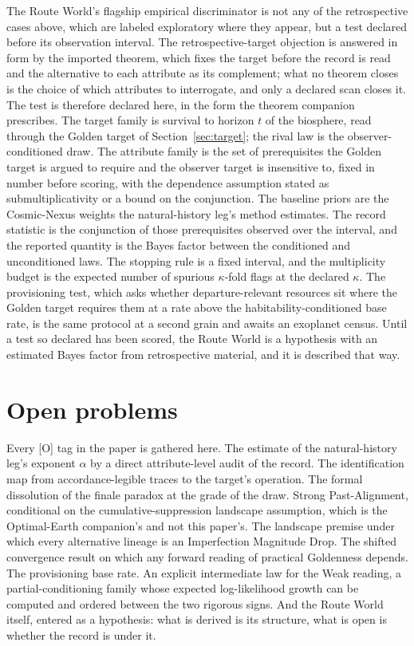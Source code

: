 The Route World's flagship empirical discriminator is not any of the
retrospective cases above, which are labeled exploratory where they
appear, but a test declared before its observation interval. The
retrospective-target objection is answered in form by the imported
theorem, which fixes the target before the record is read and the
alternative to each attribute as its complement; what no theorem closes
is the choice of which attributes to interrogate, and only a declared
scan closes it. The test is therefore declared here, in the form the
theorem companion prescribes. The target family is survival to horizon
$t$ of the biosphere, read through the Golden target of
Section~\ref{sec:target}; the rival law is the observer-conditioned
draw. The attribute family is the set of prerequisites the Golden target
is argued to require and the observer target is insensitive to, fixed in
number before scoring, with the dependence assumption stated as
submultiplicativity or a bound on the conjunction. The baseline priors are
the Cosmic-Nexus weights the natural-history leg's method estimates. The
record statistic is the conjunction of those prerequisites observed over
the interval, and the reported quantity is the Bayes factor between the
conditioned and unconditioned laws. The stopping rule is a fixed
interval, and the multiplicity budget is the expected number of spurious
$\kappa$-fold flags at the declared $\kappa$. The provisioning test, which
asks whether departure-relevant resources sit where the Golden target
requires them at a rate above the habitability-conditioned base rate,
is the same protocol at a second grain and awaits an exoplanet census.
Until a test so declared has been scored, the Route World is a hypothesis
with an estimated Bayes factor from retrospective material, and it is
described that way.

\section{Open problems}\label{sec:open}

Every [O] tag in the paper is gathered here. The estimate of the
natural-history leg's exponent $\alpha$ by a direct attribute-level audit
of the record. The identification map from accordance-legible traces to
the target's operation. The formal dissolution of the finale paradox at
the grade of the draw. Strong Past-Alignment, conditional on the
cumulative-suppression landscape assumption, which is the Optimal-Earth
companion's and not this paper's. The landscape premise under which every
alternative lineage is an Imperfection Magnitude Drop. The shifted
convergence result on which any forward reading of practical Goldenness
depends. The provisioning base rate. An explicit intermediate law for the Weak reading, a
partial-conditioning family whose expected log-likelihood growth can be
computed and ordered between the two rigorous signs. And the Route World
itself, entered as a hypothesis: what is derived is its structure, what
is open is whether the record is under it.

